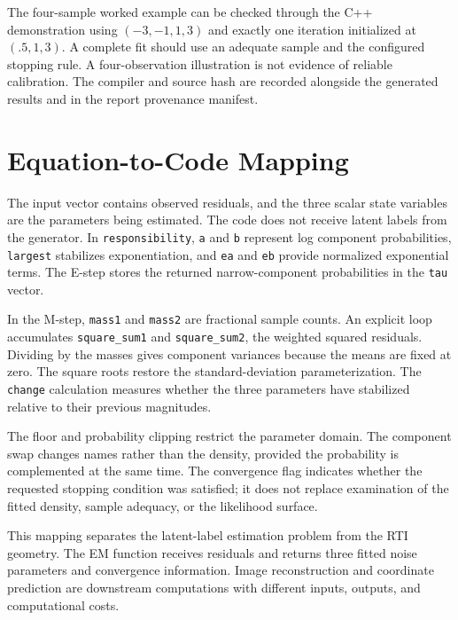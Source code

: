 \documentclass[conference,letterpaper]{IEEEtran}
\begin{document}
The four-sample worked example can be checked through the C++ demonstration using $(-3,-1,1,3)$ and exactly one iteration initialized at $(.5,1,3)$. A complete fit should use an adequate sample and the configured stopping rule. A four-observation illustration is not evidence of reliable calibration. The compiler and source hash are recorded alongside the generated results and in the report provenance manifest.

\begin{figure}[t]

\end{figure}

\section{Equation-to-Code Mapping}
The input vector contains observed residuals, and the three scalar state variables are the parameters being estimated. The code does not receive latent labels from the generator. In \texttt{responsibility}, \texttt{a} and \texttt{b} represent log component probabilities, \texttt{largest} stabilizes exponentiation, and \texttt{ea} and \texttt{eb} provide normalized exponential terms. The E-step stores the returned narrow-component probabilities in the \texttt{tau} vector.

In the M-step, \texttt{mass1} and \texttt{mass2} are fractional sample counts. An explicit loop accumulates \texttt{square\_sum1} and \texttt{square\_sum2}, the weighted squared residuals. Dividing by the masses gives component variances because the means are fixed at zero. The square roots restore the standard-deviation parameterization. The \texttt{change} calculation measures whether the three parameters have stabilized relative to their previous magnitudes.

The floor and probability clipping restrict the parameter domain. The component swap changes names rather than the density, provided the probability is complemented at the same time. The convergence flag indicates whether the requested stopping condition was satisfied; it does not replace examination of the fitted density, sample adequacy, or the likelihood surface.

This mapping separates the latent-label estimation problem from the RTI geometry. The EM function receives residuals and returns three fitted noise parameters and convergence information. Image reconstruction and coordinate prediction are downstream computations with different inputs, outputs, and computational costs.
\end{document}
